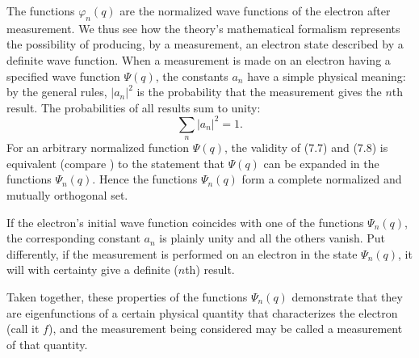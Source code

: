 The functions $\varphi_n(q)$ are the normalized wave functions of the
electron after measurement. We thus see how the theory's mathematical
formalism represents the possibility of producing, by a measurement, an
electron state described by a definite wave function.
When a measurement is made on an electron having a specified wave function
$\Psi(q)$, the constants $a_n$ have a simple physical meaning: by the general
rules, $|a_n|^2$ is the probability that the measurement gives the $n$th
result. The probabilities of all results sum to unity:
\begin{equation}
  \sum_n|a_n|^2=1.
  \tag{7.8}
\end{equation}
For an arbitrary normalized function $\Psi(q)$, the validity of (7.7) and
(7.8) is equivalent (compare ) to the statement that $\Psi(q)$ can be
expanded in the functions $\Psi_n(q)$. Hence the functions $\Psi_n(q)$ form
a complete normalized and mutually orthogonal set.

If the electron's initial wave function coincides with one of the functions
$\Psi_n(q)$, the corresponding constant $a_n$ is plainly unity and all the
others vanish. Put differently, if the measurement is performed on an electron
in the state $\Psi_n(q)$, it will with certainty give a definite ($n$th) result.

Taken together, these properties of the functions $\Psi_n(q)$ demonstrate
that they are eigenfunctions of a certain physical quantity that characterizes the electron (call it
$f$), and the measurement being considered may be called a measurement of
that quantity.

